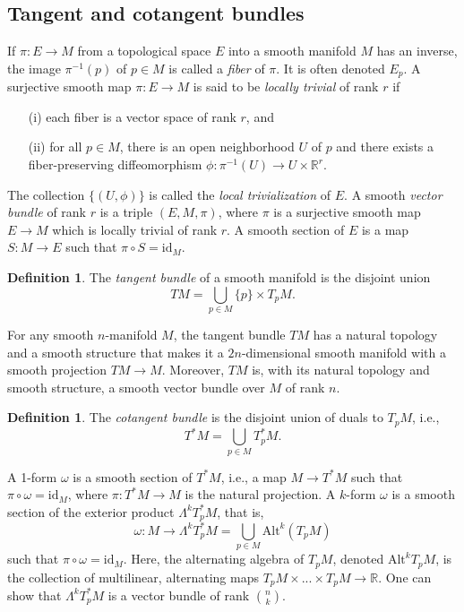 \documentclass{article}
\theoremstyle{plain}
\theoremstyle{definition}
\newtheorem{defin}[teo]{Definition}
\newcommand{\R}{\ensuremath{\mathbb{R}}}
\newcommand{\Alt}{\ensuremath{\mathrm{Alt}}}
\newcommand{\id}{\ensuremath{\mathrm{id}}}
\begin{document}
\subsection{Tangent and cotangent bundles}
If $\pi:E\to M$ from a topological space $E$ into a smooth manifold $M$ has an inverse, the image $\pi^{-1}(p)$ of $p\in M$ is called a \textit{fiber} of $\pi$. It is often denoted $E_p$. A surjective smooth map $\pi: E\to M$ is said to be \textit{locally trivial} of rank $r$ if
\begin{enumerate}
	\item[(i)] each fiber is a vector space of rank $r$, and
	\item[(ii)] for all $p\in M$, there is an open neighborhood $U$ of $p$ and there exists a fiber-preserving diffeomorphism $\phi:\pi^{-1}(U)\to U\times \R^r$.
\end{enumerate}
%
The collection $\{(U,\phi)\}$ is called the \textit{local trivialization} of $E$.	A smooth \textit{vector bundle} of rank $r$ is a triple $(E,M,\pi)$, where $\pi$ is a surjective smooth map $E\to M$ which is locally trivial of rank $r$. A smooth section of $E$ is a map $S:M\to E$ such that $\pi\circ S=\id_M$. 

\begin{defin}
	The \textit{tangent bundle} of a smooth manifold is the disjoint union
	\[
	TM=\bigcup_{p\in M}\{p\}\times T_pM.
	\]
\end{defin}

For any smooth $n$-manifold $M$, the tangent bundle $TM$ has a natural topology and a smooth structure that makes it a $2n$-dimensional smooth manifold with a smooth projection $TM\to M$. Moreover, $TM$ is, with its natural topology and smooth structure, a smooth vector bundle over $M$ of rank $n$.

\begin{defin}
	The \textit{cotangent bundle} is the disjoint union of duals to $T_pM$, i.e.,
	\[
	T^*M = \bigcup_{p\in M} T_p^*M.
	\]
\end{defin}

A 1-form $\omega$ is a smooth section of $T^*M$, i.e., a map $M\to T^*M$ such that $\pi\circ \omega=\id_M$, where $\pi:T^*M\to M$ is the natural projection. A $k$-form $\omega$ is a smooth section of the exterior product $\Lambda^kT_p^*M$, that is,
\[
 \omega:M\to \Lambda^kT_p^*M = \bigcup_{p\in M}\Alt^k(T_pM)
\]
such that $\pi\circ \omega=\id_M$. Here, the alternating algebra of $T_pM$, denoted $\Alt^kT_pM$, is the collection of multilinear, alternating maps $T_pM\times ...\times T_pM\to \R$. One can show that $\Lambda^kT_p^*M$ is a vector bundle of rank $\binom{n}{k}$.
\end{document}
